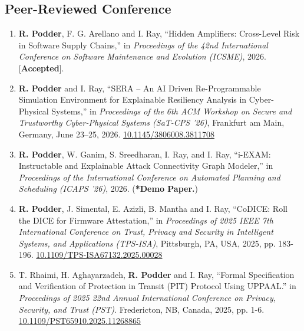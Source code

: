 \documentclass[11pt, a4paper]{article}
\begin{document}
\subsection{\color{cvred}Peer-Reviewed Conference}

\begin{enumerate}[leftmargin=*, label=\arabic*., itemsep=4pt, topsep=2pt]

\item   \textbf{\color{cvred}R. Podder}, F. G. Arellano and I. Ray, ``Hidden Amplifiers: Cross-Level Risk in Software Supply Chains,'' in \textit{Proceedings of the 42nd International Conference on Software Maintenance and Evolution (ICSME)}, 2026. [\textbf{Accepted}].

\item \textbf{\color{cvred}R. Podder} and I. Ray, ``SERA – An AI Driven Re-Programmable Simulation Environment for Explainable Resiliency Analysis in Cyber-Physical Systems,'' in \textit{Proceedings of the 6th ACM Workshop on Secure and Trustworthy Cyber-Physical Systems (SaT-CPS '26)}, Frankfurt am Main, Germany, June 23--25, 2026. \href{https://doi.org/10.1145/3806008.3811708}{\color{cvgray}10.1145/3806008.3811708}

\item \textbf{\color{cvred}R. Podder}, W. Ganim, S. Sreedharan, I. Ray, and I. Ray, ``i-EXAM: Instructable and Explainable Attack
Connectivity Graph Modeler,'' in \textit{Proceedings of the International Conference on Automated Planning and Scheduling
(ICAPS '26)}, 2026. (\textbf{*Demo Paper.})

\item \textbf{\color{cvred}R. Podder}, J. Simental, E. Azizli, B. Mantha and I. Ray, ``CoDICE: Roll the DICE for Firmware Attestation,'' in \textit{Proceedings of 2025 IEEE 7th International Conference on Trust, Privacy and Security in Intelligent Systems, and Applications (TPS-ISA)}, Pittsburgh, PA, USA, 2025, pp. 183-196. \href{https://ieeexplore.ieee.org/abstract/document/11410223}{\color{cvgray}10.1109/TPS-ISA67132.2025.00028}

\item T. Rhaimi, H. Aghayarzadeh, \textbf{\color{cvred}R. Podder} and I. Ray, ``Formal Specification and Verification of Protection in Transit (PIT) Protocol Using UPPAAL.'' in \textit{Proceedings of 2025 22nd Annual International Conference on Privacy, Security, and Trust (PST)}. Fredericton, NB, Canada, 2025, pp. 1-6. \href{https://ieeexplore.ieee.org/abstract/document/11268865}{\color{cvgray}10.1109/PST65910.2025.11268865}


\end{enumerate}
\end{document}
